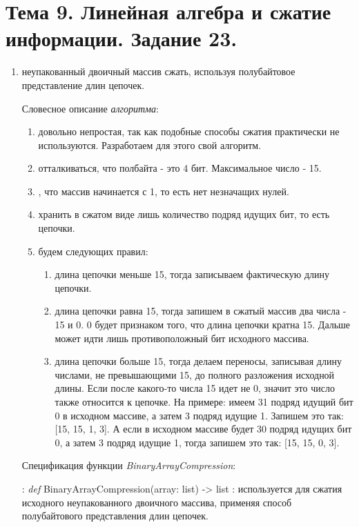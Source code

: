 \section{Тема 9. Линейная алгебра и сжатие информации. Задание 23.}
\label{sec:task9}

\begin{enumerate}
	\item{} неупакованный двоичный массив сжать, используя полубайтовое представление длин цепочек.
	\begin{item}
		Словесное описание \textit{алгоритма}:

		\begin{enumerate}
			\item{} довольно непростая, так как подобные способы сжатия практически не используются. Разработаем для этого свой алгоритм.
			\item{} отталкиваться, что полбайта - это 4 бит. Максимальное число - 15.
			\item{}, что массив начинается с 1, то есть нет незначащих нулей.
			\item{} хранить в сжатом виде лишь количество подряд идущих бит, то есть цепочки.
			\item{} будем следующих правил:
			    \begin{enumerate}[label=\arabic*.]
			    \item{} длина цепочки меньше 15, тогда записываем фактическую длину цепочки.
			    \item{} длина цепочки равна 15, тогда запишем в сжатый массив два числа - 15 и 0. 0 будет признаком того, что длина цепочки кратна 15. Дальше может идти лишь противоположный бит исходного массива.
			    \item{} длина цепочки больше 15, тогда делаем переносы, записывая длину числами, не превышающими 15, до полного разложения исходной длины. Если после какого-то числа 15 идет не 0, значит это число также относится к цепочке. На примере: имеем 31 подряд идущий бит 0 в исходном массиве, а затем 3 подряд идущие 1. Запишем это так: [15, 15, 1, 3]. А если в исходном массиве будет 30 подряд идущих бит 0, а затем 3 подряд идущие 1, тогда запишем это так: [15, 15, 0, 3].
			    \end{enumerate}
		\end{enumerate}
	\end{item}
	\begin{item}
		Спецификация функции \textit{BinaryArrayCompression}:
		\begin{enumerate}
			: \colorbox{pybg}{\textit{def} BinaryArrayCompression(array: list) -> list}
			: используется для сжатия исходного неупакованного двоичного массива, применяя способ полубайтового представления длин цепочек.
		\end{enumerate}


\end{item}
\end{enumerate}
